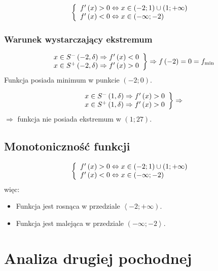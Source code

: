 \documentclass[a4paper,12pt]{article}
\newcommand{\podx}{
		\ensuremath f' \left( x \right)
	}
\begin{document}
\[ \left\{
	\begin{array}{l}
		\podx > 0 \Leftrightarrow x \in \left( -2; 1 \right) \cup \left( 1; + \infty \right) \\
		\podx < 0 \Leftrightarrow x \in \left( - \infty; -2 \right)
	\end{array}
\right. \]

\subsubsection*{Warunek wystarczający ekstremum}

\[ \left.
		\begin{array}{l}
			x \in S^- \left( -2, \delta \right) \Rightarrow \podx < 0 \\
			x \in S^+ \left( -2, \delta \right) \Rightarrow \podx > 0
		\end{array}
	\right\} \Rightarrow f \left( -2 \right) = 0 = f_{\text{min}}
\]
Funkcja posiada minimum w punkcie $\left( -2; 0 \right)$.

\[ \left.
		\begin{array}{l}
			x \in S^- \left( 1, \delta \right) \Rightarrow \podx > 0 \\
			x \in S^+ \left( 1, \delta \right) \Rightarrow \podx > 0
		\end{array}
	\right\} \Rightarrow 
\]
$\Rightarrow$ funkcja nie posiada ekstremum w $\left( 1; 27 \right)$.

\subsection{Monotoniczność funkcji}

\[ \left\{
	\begin{array}{l}
		\podx > 0 \Leftrightarrow x \in \left( -2; 1 \right) \cup \left( 1; + \infty \right) \\
		\podx < 0 \Leftrightarrow x \in \left( - \infty; -2 \right)
	\end{array}
\right. \]
więc:
\begin{itemize}
	\item Funkcja jest rosnąca w przedziale $\left\langle -2; +\infty \right)$.
\item Funkcja jest malejąca w przedziale $\left( -\infty ; -2 \right\rangle$.
\end{itemize}

\section{Analiza drugiej pochodnej}
\end{document}
